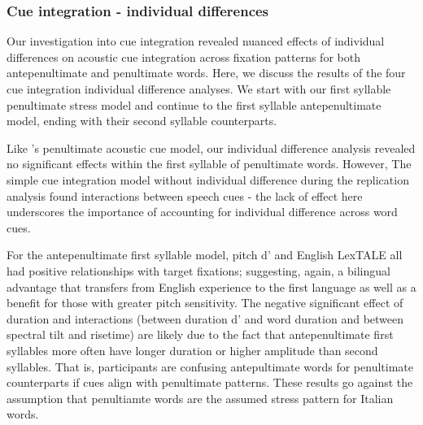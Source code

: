 \subsubsection{Cue integration - individual differences}
Our investigation into cue integration revealed nuanced effects of individual differences on acoustic cue integration across fixation patterns for both antepenultimate and penultimate words. Here, we discuss the results of the four cue integration individual difference analyses. We start with our first syllable penultimate stress model and continue to the first syllable antepenultimate model, ending with their second syllable counterparts.

Like \cite{Sulpizio_McQueen_2012}'s penultimate acoustic cue model, our individual difference analysis revealed no significant effects within the first syllable of penultimate words. However, The simple cue integration model without individual difference during the replication analysis found interactions between speech cues - the lack of effect here underscores the importance of accounting for individual difference across word cues.

For the antepenultimate first syllable model, pitch d' and English LexTALE all had positive relationships with target fixations; suggesting, again, a bilingual advantage that transfers from English experience to the first language as well as a benefit for those with greater pitch sensitivity. The negative significant effect of duration and interactions (between duration d' and word duration and between spectral tilt and risetime) are likely due to the fact that antepenultimate first syllables more often have longer duration or higher amplitude than second syllables. That is, participants are confusing antepultimate words for penultimate counterparts if cues align with penultimate patterns. These results go against the assumption that penultiamte words are the assumed stress pattern for Italian words.

